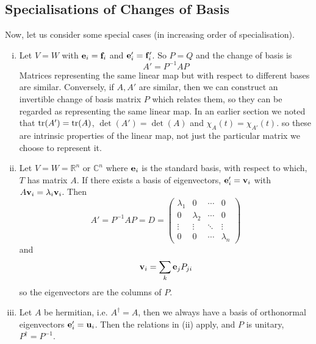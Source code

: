 \documentclass{article}
\begin{document}
\subsection{Specialisations of Changes of Basis}
Now, let us consider some special cases (in increasing order of specialisation).
\begin{enumerate}[(i)]
    \item Let $V=W$ with $\vb e_i = \vb f_i$ and $\vb e'_i = \vb f'_i$. So $P=Q$ and the change of basis is
          \[ A' = P^{-1}AP \]
          Matrices representing the same linear map but with respect to different bases are similar. Conversely, if $A, A'$ are similar, then we can construct an invertible change of basis matrix $P$ which relates them, so they can be regarded as representing the same linear map. In an earlier section we noted that $\tr(A') = \tr(A)$, $\det(A') = \det(A)$ and $\chi_A(t) = \chi_{A'}(t)$. so these are intrinsic properties of the linear map, not just the particular matrix we choose to represent it.
    \item Let $V=W=\mathbb R^n$ or $\mathbb C^n$ where $\vb e_i$ is the standard basis, with respect to which, $T$ has matrix $A$. If there exists a basis of eigenvectors, $\vb e'_i = \vb v_i$ with $A\vb v_i = \lambda_i\vb v_i$. Then
          \[ A' = P^{-1}AP = D = \begin{pmatrix}
                  \lambda_1 & 0         & \cdots & 0         \\
                  0         & \lambda_2 & \cdots & 0         \\
                  \vdots    & \vdots    & \ddots & \vdots    \\
                  0         & 0         & \cdots & \lambda_n
              \end{pmatrix} \]
          and
          \[ \vb v_i = \sum_k \vb e_j P_{ji} \]
          so the eigenvectors are the columns of $P$.
    \item Let $A$ be hermitian, i.e. $A^\dagger = A$, then we always have a basis of orthonormal eigenvectors $\vb e'_i = \vb u_i$. Then the relations in (ii) apply, and $P$ is unitary, $P^\dagger = P^{-1}$.
\end{enumerate}
\end{document}
